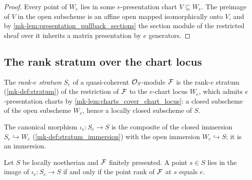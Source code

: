 \begin{proof}
  \leanok
  Every point of \(W_e\) lies in some \(e\)-presentation chart
  \(V \subseteq W_e\).  The preimage of \(V\) in the open subscheme is an
  affine open mapped isomorphically onto \(V\), and by
  \ref{mk-lem:presentation_pullback_sections} the section module of the
  restricted sheaf over it inherits a matrix presentation by \(e\)
  generators.
\end{proof}

\subsection{The rank stratum over the chart locus}

\begin{definition}
  \label{mk-def:rank_stratum}
  \leanok

  The \emph{rank-\(e\) stratum} \(S_e\) of a quasi-coherent
  \(\mathcal{O}_S\)-module \(\mathcal{F}\) is the rank-\(e\) stratum (\ref{mk-def:stratum}) of
  the restriction of \(\mathcal{F}\) to the \(e\)-chart locus \(W_e\), which admits
  \(e\)-presentation charts by \ref{mk-lem:charts_cover_chart_locus}: a
  closed subscheme of the open subscheme \(W_e\), hence a locally closed
  subscheme of \(S\).
\end{definition}

\begin{definition}
  \label{mk-def:rank_stratum_immersion}
  \leanok

  The canonical morphism \(\iota_e : S_e \to S\) is the composite of the
  closed immersion \(S_e \hookrightarrow W_e\)
  (\ref{mk-def:stratum_immersion}) with the open immersion
  \(W_e \hookrightarrow S\); it is an immersion.
\end{definition}

\begin{theorem}
  \label{mk-thm:mem_range_rank_stratum}
  \leanok

  Let \(S\) be locally noetherian and \(\mathcal{F}\) finitely presented.  A point
  \(s \in S\) lies in the image of \(\iota_e : S_e \to S\) if and only if
  the point rank of \(\mathcal{F}\) at \(s\) equals \(e\).
\end{theorem}

